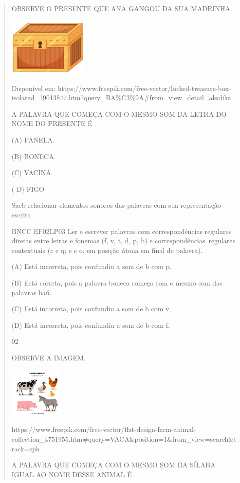 {{{{\begin{verse}
{{\begin{escolha}
{{{{{OBSERVE O PRESENTE QUE ANA GANGOU DA SUA MADRINHA.

\includegraphics[width=1.55556in,height=1.16111in]{media/image147.jpeg}

Disponível em:
https://www.freepik.com/free-vector/locked-treasure-box-isolated\_19013847.htm?query=BA\%C3\%9A\#from\_view=detail\_alsolike

A PALAVRA QUE COMEÇA COM O MESMO SOM DA LETRA DO NOME DO PRESENTE É

(A) PANELA.

(B) BONECA.

(C) VACINA.

( D) FIGO

Saeb relacionar elementos sonoros das palavras com sua representação
escrita

BNCC EF02LP03 Ler e escrever palavras com correspondências regulares
diretas entre letras e fonemas (f, v, t, d, p, b) e
correspondências~regulares contextuais (c e q; e e o, em posição átona
em final de palavra).

(A) Está incorreta, \protect\hypertarget{_Hlk129267612}{}{}pois
confundiu a som de b com p.

(B) Está correta, pois a palavra boneca começa com o mesmo som das
palavras baú.

(C) Está incorreta, pois confundiu a som de b com v.

(D) Está incorreta, pois confundiu a som de b com f.

\num{02}

OBSERVE A IMAGEM.

\includegraphics[width=1.10000in,height=0.99236in]{media/image148.jpeg}

https://www.freepik.com/free-vector/flat-design-farm-animal-collection\_4751955.htm\#query=VACA\&position=1\&from\_view=search\&track=sph

\protect\hypertarget{_Hlk129501578}{}{}A PALAVRA QUE COMEÇA COM O MESMO
SOM DA SÍLABA IGUAL AO NOME DESSE ANIMAL É

}}}}}
\end{escolha}}}
\end{verse}}}}}
